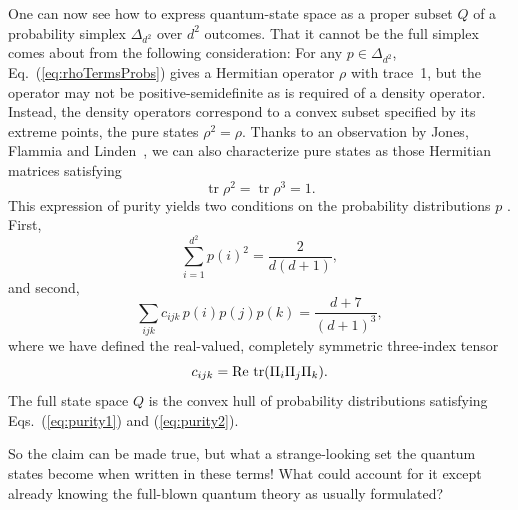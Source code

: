 \documentclass[aps,pra,superscriptaddress,10pt,tightenlines,twocolumn,nofootinbib]{revtex4}
\theoremstyle{remark}
\newcommand{\qp}{Q}
\DeclareMathOperator{\Tr}{tr}
\begin{document}
One can now see how to express quantum-state space as a proper subset $\qp$ of a probability simplex $\Delta_{d^2}$ over $d^2$ outcomes.  That it cannot be the full simplex comes about from the following consideration:  For any ${p}\in \Delta_{d^2}$, Eq.~(\ref{eq:rhoTermsProbs}) gives a Hermitian operator $\rho$ with trace~1, but the operator may not be positive-semidefinite as is required of a density operator.  Instead, the density operators correspond to a convex subset specified by its extreme points, the pure states $\rho^2 = \rho$.  Thanks to an observation by Jones, Flammia and Linden~\cite{flammia2004,jones2005}, we can also characterize pure states as those Hermitian matrices satisfying
\begin{equation}
\Tr\rho^2 = \Tr\rho^3 = 1.
\end{equation}
This expression of purity yields two conditions on the probability
distributions ${p}$ \cite{fuchs2009,appleby2011,fuchs2013}.  First,
\begin{equation}
\sum_{i=1}^{d^2} p(i)^2 = \frac{2}{d(d+1)},
\label{eq:purity1}
\end{equation}
and second,
\begin{equation}
\sum_{ijk} c_{ijk}\, p(i) p(j) p(k) = \frac{d+7}{(d+1)^3},
\label{eq:purity2}
\end{equation}
where we have defined the real-valued, completely symmetric three-index tensor
\begin{equation}
c_{ijk} = \hbox{Re}\, \Tr (\Pi_i \Pi_j \Pi_k).
\label{eq:c-tensor}
\end{equation}
The full state space $\qp$ is the convex hull of probability distributions satisfying Eqs.~(\ref{eq:purity1}) and (\ref{eq:purity2}).

So the claim can be made true, but what a strange-looking set the quantum states become when written in these terms!  What could account for it except already knowing the full-blown quantum theory as usually formulated?
\end{document}
